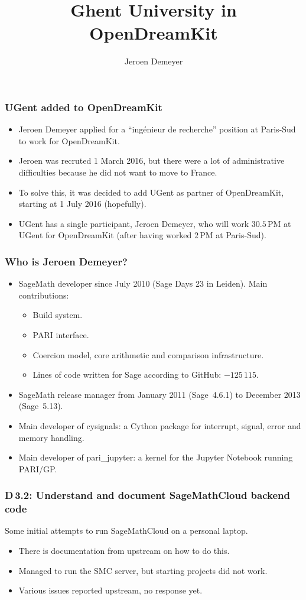 \documentclass{beamer}
\title{Ghent University in OpenDreamKit}
\author{Jeroen Demeyer}
\begin{document}
\begin{frame}
  \titlepage
\end{frame}

\begin{frame}
\frametitle{UGent added to OpenDreamKit}

\begin{itemize}
\item Jeroen Demeyer applied for a ``ing\'enieur de recherche'' position
at Paris-Sud to work for OpenDreamKit.
\item Jeroen was recruted 1 March 2016,
but there were a lot of administrative difficulties because he did not want to move to France.
\item To solve this, it was decided to add UGent as partner of OpenDreamKit,
starting at 1 July 2016 (hopefully).
\item UGent has a single participant, Jeroen Demeyer,
who will work $30.5\,\text{PM}$ at UGent for OpenDreamKit
(after having worked $2\,\text{PM}$ at Paris-Sud).
\end{itemize}
\end{frame}

\begin{frame}
\frametitle{Who is Jeroen Demeyer?}

\begin{itemize}
\item SageMath developer since July 2010 (Sage Days 23 in Leiden).
Main contributions:
\begin{itemize}
\item Build system.
\item PARI interface.
\item Coercion model, core arithmetic and comparison infrastructure.
\item Lines of code written for Sage according to GitHub: $-125\,115$.
\end{itemize}
\item SageMath release manager from January 2011 (Sage~4.6.1) to December 2013 (Sage~5.13).
\item Main developer of cysignals:
a Cython package for interrupt, signal, error and memory handling.
\item Main developer of pari\_jupyter:
a kernel for the Jupyter Notebook running PARI/GP.
\end{itemize}
\end{frame}

\begin{frame}
\frametitle{D\,3.2: Understand and document SageMathCloud backend code}

Some initial attempts to run SageMathCloud on a personal laptop.

\begin{itemize}
\item There is documentation from upstream on how to do this.

\item Managed to run the SMC server, but starting projects did not work.

\item Various issues reported upstream, no response yet.
\end{itemize}
\end{frame}
\end{document}
